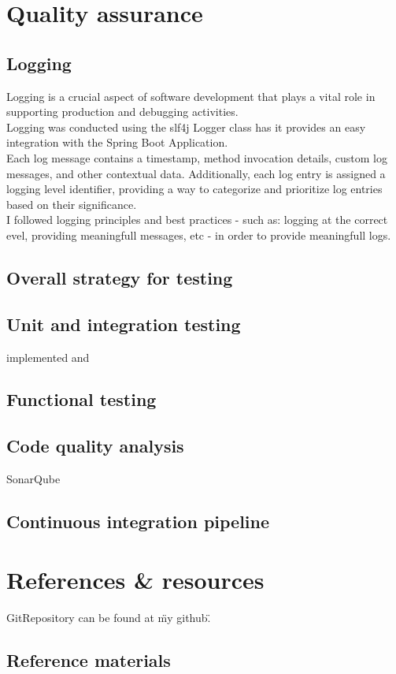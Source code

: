 \documentclass[12pt]{article}
\begin{document}
\section{Quality assurance}

\subsection{Logging}

Logging is a crucial aspect of software development that plays a vital role in supporting production and debugging activities. \\
Logging was conducted using the slf4j Logger class has it provides an easy integration with the Spring Boot Application.\\
Each log message contains a timestamp, method invocation details, custom log messages, and other contextual data. Additionally, each log entry is assigned a logging level identifier, providing a way to categorize and prioritize log entries based on their significance.\\
I followed logging principles and best practices - such as: logging at the correct evel, providing meaningfull messages, etc - in order to provide meaningfull logs.

\subsection{Overall strategy for testing}


\subsection{Unit and integration testing}

implemented and 

\subsection{Functional testing}

\subsection{Code quality analysis}

SonarQube

\subsection{Continuous integration pipeline}

\section{References \& resources}

GitRepository can be found at \"my github\".

\subsection{Reference materials}
\end{document}
